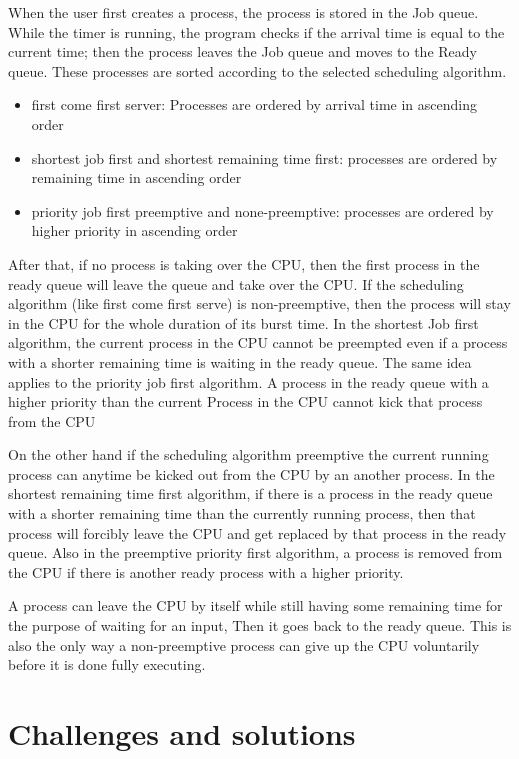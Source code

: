\documentclass{article}
\begin{document}
When the user first creates a process, the process is stored in the Job queue. While the timer is running, the program checks if the arrival time is equal to the current time; then the process leaves the Job queue and moves to the Ready queue. These processes are sorted according to the selected scheduling algorithm.
\begin{itemize}
    \item first come first server: Processes are ordered by arrival time in ascending order
    \item shortest job first and shortest remaining time first: processes are ordered by remaining time in ascending order 
    \item priority job first preemptive and none-preemptive: processes are ordered by higher priority in ascending order
\end{itemize}
After that, if no process is taking over the CPU, then the first process in the ready queue will leave the queue and take over the CPU. If the scheduling algorithm (like first come first serve) is non-preemptive, then the process will stay in the CPU for the whole duration of its burst time. In the shortest Job first algorithm, the current process in the CPU cannot be preempted even if a process with a shorter remaining time is waiting in the ready queue. The same idea applies to the priority job first algorithm. A process in the ready queue with a higher priority than the current Process in the CPU cannot kick that process from the CPU 

On the other hand if the scheduling algorithm preemptive the current running process can anytime be kicked out from the CPU by an another process. In the shortest remaining time first algorithm, if there is a process in the ready queue with a shorter remaining time than the currently running process, then that process will forcibly leave the CPU and get replaced by that process in the ready queue. Also in the preemptive priority first algorithm, a process is removed from the CPU if there is another ready process with a higher priority.

A process can leave the CPU by itself while still having some remaining time for the purpose of waiting for an input, Then it goes back to the ready queue. This is also the only way a non-preemptive process can give up the CPU voluntarily before it is done fully executing.


\section{Challenges and solutions}
\end{document}
